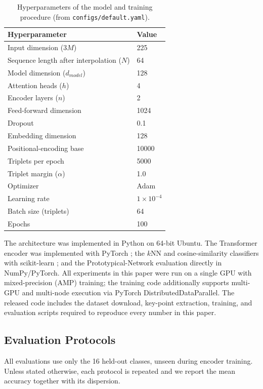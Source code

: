 \documentclass{article}
\begin{document}
\begin{table}[h!]
\centering
\begin{tabular}{ll}
\toprule
\textbf{Hyperparameter} & \textbf{Value} \\
\midrule
Input dimension ($3M$)            & 225 \\
Sequence length after interpolation ($N$) & 64 \\
Model dimension ($d_{model}$)     & 128 \\
Attention heads ($h$)             & 4 \\
Encoder layers ($n$)              & 2 \\
Feed-forward dimension            & 1024 \\
Dropout                           & 0.1 \\
Embedding dimension               & 128 \\
Positional-encoding base          & 10000 \\
Triplets per epoch                & 5000 \\
Triplet margin ($\alpha$)         & 1.0 \\
Optimizer                         & Adam \cite{kingma2014adam} \\
Learning rate                     & $1\times10^{-4}$ \\
Batch size (triplets)             & 64 \\
Epochs                            & 100 \\
\bottomrule
\end{tabular}
\caption{Hyperparameters of the model and training procedure (from \texttt{configs/default.yaml}).}
\label{tab:hyper}
\end{table}

The architecture was implemented in Python on 64-bit Ubuntu. The Transformer encoder was implemented with PyTorch \cite{paszke2019pytorch}; the $k$NN and cosine-similarity classifiers with scikit-learn \cite{pedregosa2011scikit}; and the Prototypical-Network evaluation directly in NumPy/PyTorch. All experiments in this paper were run on a single GPU with mixed-precision (AMP) training; the training code additionally supports multi-GPU and multi-node execution via PyTorch DistributedDataParallel. The released code includes the dataset download, key-point extraction, training, and evaluation scripts required to reproduce every number in this paper.

\subsection{Evaluation Protocols}
\label{subsec:protocols}
All evaluations use only the 16 held-out classes, unseen during encoder training. Unless stated otherwise, each protocol is repeated and we report the mean accuracy together with its dispersion.
\end{document}
